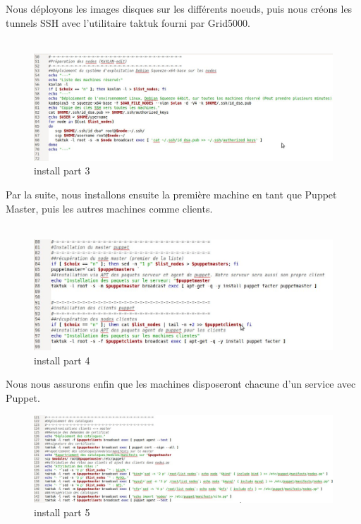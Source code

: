 \documentclass[a4paper, 10pt, onecolumn]{report}
\begin{document}
Nous déployons les images disques sur les différents noeuds, puis nous créons les tunnels
SSH avec l’utilitaire taktuk fourni par Grid5000.\\
\\

\begin{figure}[htb]
\begin{center}
\includegraphics[scale=0.450]{images/install_3}
\caption{install part 3}
\end{center}
\end{figure}

Par la suite, nous installons ensuite la première machine en tant que Puppet Master, puis les
autres machines comme clients. \\
\\
\begin{figure}[htb]
\begin{center}
\includegraphics[scale=0.40]{images/install_4}
\caption{install part 4}
\end{center}
\end{figure}

Nous nous assurons enfin que les machines disposeront chacune d’un service avec Puppet.

\begin{figure}[htb]
\begin{center}
\includegraphics[scale=0.35]{images/install_5}
\caption{install part 5}
\end{center}
\end{figure}
\end{document}
